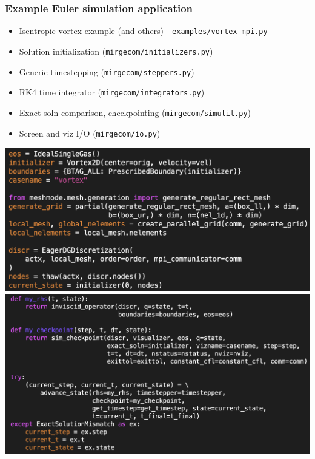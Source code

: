 \begin{frame}\frametitle{Example Euler simulation application}
\begin{multicols}{2}
\begin{itemize}
\item Isentropic vortex example (and others) - \texttt{examples/vortex-mpi.py}
\item Solution initialization (\texttt{mirgecom/initializers.py})
\item Generic timestepping (\texttt{mirgecom/steppers.py})
\item RK4 time integrator (\texttt{mirgecom/integrators.py})
\item Exact soln comparison, checkpointing (\texttt{mirgecom/simutil.py})
\item Screen and viz I/O (\texttt{mirgecom/io.py})
\end{itemize}
\end{multicols}
\includegraphics[width=.45\textwidth]{figures/vortex_driver1.png}
\hspace{.2in}
\includegraphics[width=.45\textwidth]{figures/vortex_driver2.png}
\end{frame}

